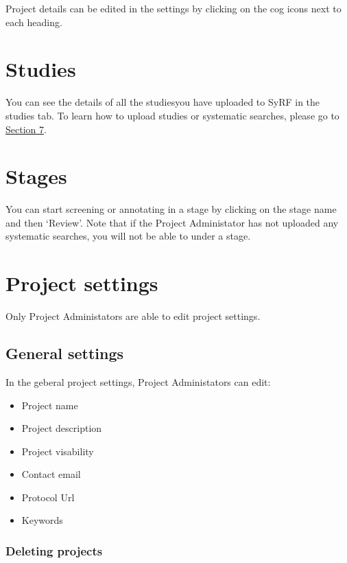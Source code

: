 \documentclass[
]{book}
\providecommand{\tightlist}{%
  \setlength{\itemsep}{0pt}\setlength{\parskip}{0pt}}
\begin{document}
Project details can be edited in the settings by clicking on the cog icons next to each heading.

\hypertarget{studies}{%
\section{Studies}\label{studies}}

You can see the details of all the studiesyou have uploaded to SyRF in the studies tab. To learn how to upload studies or systematic searches, please go to \href{https://camaradesuk.github.io/syrf_userguide/systematicSearch.html}{Section 7}.

\hypertarget{stages}{%
\section{Stages}\label{stages}}

You can start screening or annotating in a stage by clicking on the stage name and then `Review'. Note that if the Project Administator has not uploaded any systematic searches, you will not be able to under a stage.

\hypertarget{project-settings}{%
\section{Project settings}\label{project-settings}}

Only Project Administators are able to edit project settings.

\hypertarget{general-settings}{%
\subsection{General settings}\label{general-settings}}

In the geberal project settings, Project Administators can edit:

\begin{itemize}
\tightlist
\item
  Project name
\item
  Project description
\item
  Project visability
\item
  Contact email
\item
  Protocol Url
\item
  Keywords
\end{itemize}

\hypertarget{deleting-projects}{%
\subsubsection{Deleting projects}\label{deleting-projects}}
\end{document}
